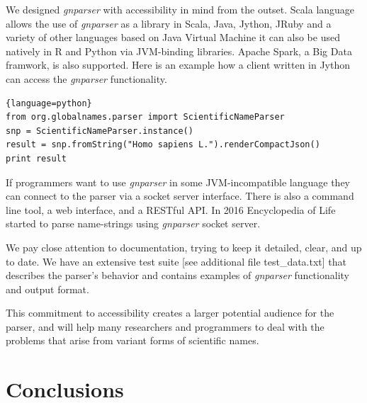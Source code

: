 \documentclass{bmcart}
\begin{document}
We designed \textit{gnparser} with accessibility in mind from the outset. Scala language allows the use of \textit{gnparser} as a library in Scala, Java, Jython, JRuby and a variety of other languages based on Java Virtual Machine it can also be used natively in R and Python via JVM-binding libraries. Apache Spark, a Big Data framwork, is also supported.  Here is an example how a client written in Jython can access the \textit{gnparser} functionality.

\begin{lstlisting}{language=python}
from org.globalnames.parser import ScientificNameParser
snp = ScientificNameParser.instance()
result = snp.fromString("Homo sapiens L.").renderCompactJson()
print result
\end{lstlisting}


If programmers want to use \textit{gnparser} in some JVM-incompatible language they can connect to the parser via a socket server interface. There is also a command line tool, a web interface, and a RESTful API\@. In 2016 Encyclopedia of Life started to parse name-strings using \textit{gnparser} socket server.


We pay close attention to documentation, trying to keep it detailed, clear, and up to date. We have an extensive test suite [see additional file test\_data.txt] that describes the parser's behavior and contains examples of \textit{gnparser} functionality and output format.

This commitment to accessibility creates a larger potential audience for the parser, and will help many researchers and programmers to deal with the problems that arise from variant forms of scientific names.

\section*{Conclusions}
\end{document}
